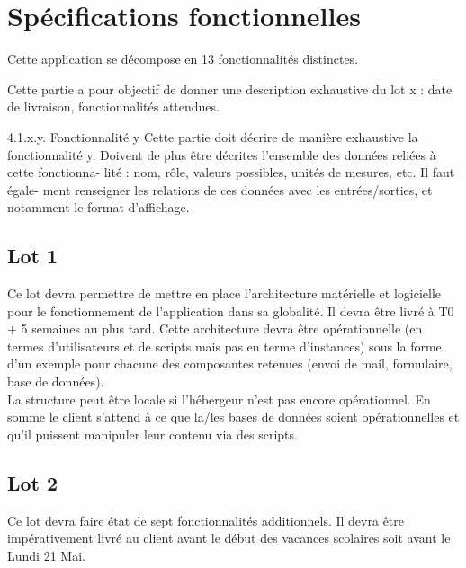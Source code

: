 \section{Spécifications fonctionnelles}
\label{spec_fonct}

Cette application se décompose en 13 fonctionnalités distinctes.

Cette partie a pour objectif de donner une description exhaustive du lot x : 
date de livraison, fonctionnalités attendues. 

4.1.x.y. Fonctionnalité y 
Cette partie doit décrire de manière exhaustive la fonctionnalité y. Doivent 
de plus être décrites l’ensemble des données reliées à cette fonctionna- 
lité : nom, rôle, valeurs possibles, unités de mesures, etc. Il faut égale- 
ment renseigner les relations de ces données avec les entrées/sorties, et 
notamment le format d’affichage. 

\subsection{Lot 1}


Ce lot devra permettre de mettre en place l'architecture matérielle et logicielle pour le fonctionnement de l'application dans sa globalité.
 Il devra être livré à T0 + 5 semaines au plus tard. Cette architecture devra être opérationnelle (en termes d'utilisateurs et de scripts mais pas en terme d'instances) sous la forme d'un exemple pour chacune des composantes retenues (envoi de mail, formulaire, base de données). 
 \\
 La structure peut être locale si l'hébergeur n'est pas encore opérationnel.
En somme le client s'attend à ce que la/les bases de données soient opérationnelles et qu'il puissent manipuler leur contenu via des scripts.



\subsection{Lot 2}
Ce lot devra faire état de sept fonctionnalités additionnels. Il devra être impérativement livré au client avant le début des vacances scolaires soit avant le Lundi 21 Mai.


